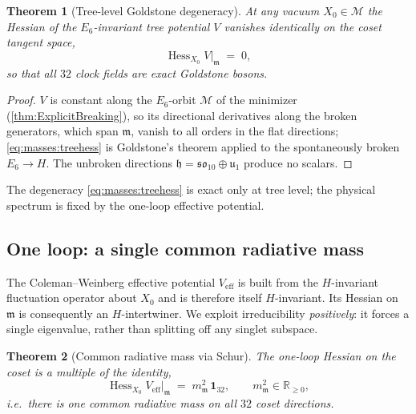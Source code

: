 \documentclass[11pt]{article}
\theoremstyle{plain}
\newtheorem{theorem}{Theorem}[section]
\theoremstyle{definition}
\theoremstyle{remark}
\begin{document}
\begin{theorem}[Tree-level Goldstone degeneracy]\label{thm:masses:tree}
At any vacuum $X_{0}\in\mathcal{M}$ the Hessian of the $E_{6}$-invariant
tree potential $V$ vanishes identically on the coset tangent space,
\begin{equation}\label{eq:masses:treehess}
  \operatorname{Hess}_{X_{0}}V\big|_{\mathfrak m} \;=\; 0,
\end{equation}
so that all $32$ clock fields are exact Goldstone bosons.
\end{theorem}

\begin{proof}
$V$ is constant along the $E_{6}$-orbit $\mathcal{M}$ of the minimizer
(\autoref{thm:ExplicitBreaking}), so its directional derivatives along the
broken generators, which span $\mathfrak m$, vanish to all orders in the
flat directions; \eqref{eq:masses:treehess} is Goldstone's theorem applied to
the spontaneously broken $E_{6}\to H$. The unbroken directions
$\mathfrak h=\mathfrak{so}_{10}\oplus\mathfrak u_{1}$ produce no scalars.
\end{proof}

The degeneracy \eqref{eq:masses:treehess} is exact only at tree level; the
physical spectrum is fixed by the one-loop effective potential.

\subsection{One loop: a single common radiative mass}
\label{sec:masses:oneloop}

The Coleman--Weinberg effective potential $V_{\mathrm{eff}}$ is built from the
$H$-invariant fluctuation operator about $X_{0}$ and is therefore itself
$H$-invariant. Its Hessian on $\mathfrak m$ is consequently an
$H$-intertwiner. We exploit irreducibility \emph{positively}: it forces a
single eigenvalue, rather than splitting off any singlet subspace.

\begin{theorem}[Common radiative mass via Schur]\label{thm:masses:schur}
The one-loop Hessian on the coset is a multiple of the identity,
\begin{equation}\label{eq:masses:schur}
  \operatorname{Hess}_{X_{0}}V_{\mathrm{eff}}\big|_{\mathfrak m}
  \;=\; m_{\mathfrak m}^{2}\,\mathbf 1_{32},
  \qquad m_{\mathfrak m}^{2}\in\mathbb R_{\ge 0},
\end{equation}
i.e.\ there is one common radiative mass on all $32$ coset directions.
\end{theorem}
\end{document}
